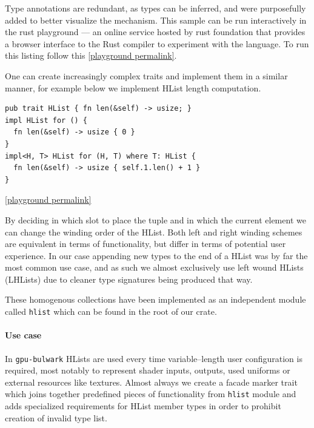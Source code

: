 Type annotations are redundant, as types can be inferred, and were purposefully added to better visualize the mechanism.
This sample can be run interactively in the rust playground --- an online service hosted by rust foundation that provides 
a browser interface to the Rust compiler to experiment with the language. 
To run this listing follow this \href{https://play.rust-lang.org/?version=stable&mode=debug&edition=2021&gist=0c13e950bb10a01dbae1981b0c15aa5f}{[playground permalink]}.

One can create increasingly complex traits and implement them in a similar manner, for example below we implement HList length computation.

\begin{lstlisting}
pub trait HList { fn len(&self) -> usize; }
impl HList for () {
  fn len(&self) -> usize { 0 }
}
impl<H, T> HList for (H, T) where T: HList {
  fn len(&self) -> usize { self.1.len() + 1 }
}
\end{lstlisting}

\noindent \href{https://play.rust-lang.org/?version=stable&mode=debug&edition=2021&gist=13d2d29f768d207f8fe7fa1bde7acef1}{[playground permalink]}

By deciding in which slot to place the tuple and in which the current element we can change the winding order of the HList.
Both left and right winding schemes are equivalent in terms of functionality, but differ in terms of potential user experience.
In our case appending new types to the end of a HList was by far the most common use case, and as such we almost exclusively use left wound HLists (LHLists)
due to cleaner type signatures being produced that way.

These homogenous collections have been implemented as an independent module called \texttt{hlist} which can be found in the root of our crate.

\paragraph{Use case}

In \texttt{gpu-bulwark} HLists are used every time variable--length user configuration is required, most notably to represent shader inputs, outputs, used uniforms or external resources like textures.
Almost always we create a facade marker trait which joins together predefined pieces of functionality from \texttt{hlist} module
and adds specialized requirements for HList member types in order to prohibit creation of invalid type list.

